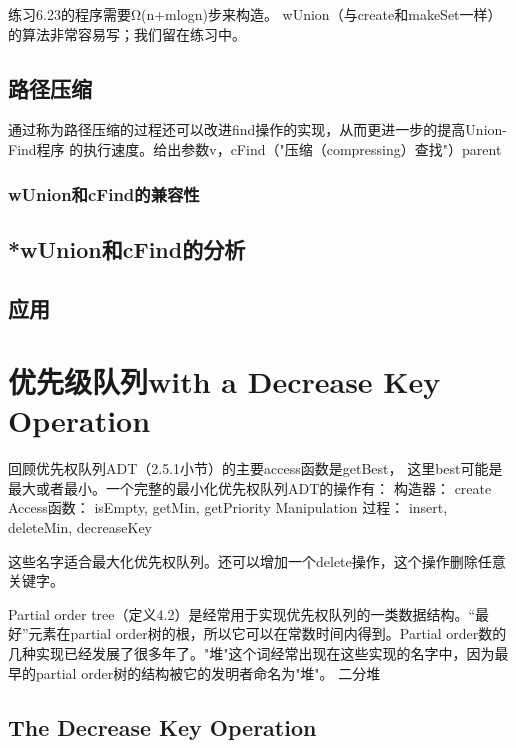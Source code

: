 练习6.23的程序需要Ω(n+mlogn)步来构造。
    wUnion（与create和makeSet一样）的算法非常容易写；我们留在练习中。


\subsection{路径压缩}
通过称为路径压缩的过程还可以改进find操作的实现，从而更进一步的提高Union-Find程序
的执行速度。给出参数v，cFind（"压缩（compressing）查找"）parent

\subsubsection{wUnion和cFind的兼容性}
\subsection{*wUnion和cFind的分析}
\subsection{应用}

\section{优先级队列with a Decrease Key Operation}
回顾优先权队列ADT（2.5.1小节）的主要access函数是getBest，
这里best可能是最大或者最小。一个完整的最小化优先权队列ADT的操作有：
构造器：            create
Access函数：        isEmpty, getMin, getPriority
Manipulation 过程： insert, deleteMin, decreaseKey


这些名字适合最大化优先权队列。还可以增加一个delete操作，这个操作删除任意关键字。

Partial order tree（定义4.2）是经常用于实现优先权队列的一类数据结构。“最好”元素在partial
order树的根，所以它可以在常数时间内得到。Partial
order数的几种实现已经发展了很多年了。"堆"这个词经常出现在这些实现的名字中，因为最早的partial
order树的结构被它的发明者命名为"堆"。 二分堆


\subsection{The Decrease Key Operation}\label{Sec:TheDecreaseKeyOperation}
